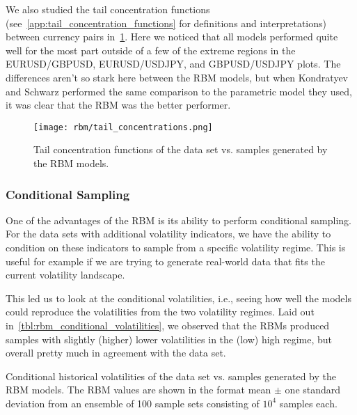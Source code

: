 We also studied the tail concentration functions (see~\cref{app:tail_concentration_functions} for definitions and interpretations) between currency pairs in~\cref{fig:rbm_tail_concentrations}.
Here we noticed that all models performed quite well for the most part outside of a few of the extreme regions in the EURUSD/GBPUSD, EURUSD/USDJPY, and GBPUSD/USDJPY plots.
The differences aren't so stark here between the RBM models, but when Kondratyev and Schwarz performed the same comparison to the parametric model they used, it was clear that the RBM was the better performer.
\begin{figure}[!htb]
    \begin{center}
        \texttt{[image: rbm/tail\_concentrations.png]}
    \end{center}
    \caption{Tail concentration functions of the data set vs. samples generated by the RBM models.}
    \label{fig:rbm_tail_concentrations}
\end{figure}

\subsubsection{Conditional Sampling}
One of the advantages of the RBM is its ability to perform conditional sampling.
For the data sets with additional volatility indicators, we have the ability to condition on these indicators to sample from a specific volatility regime.
This is useful for example if we are trying to generate real-world data that fits the current volatility landscape.

This led us to look at the conditional volatilities, i.e., seeing how well the models could reproduce the volatilities from the two volatility regimes.
Laid out in~\cref{tbl:rbm_conditional_volatilities}, we observed that the RBMs produced samples with slightly (higher) lower volatilities in the (low) high regime, but overall pretty much in agreement with the data set.
\begin{table}[!htb]
    \centering
    \begin{adjustbox}{max width=\textwidth}
        
    \end{adjustbox}
    \caption{Conditional historical volatilities of the data set vs. samples generated by the RBM models. The RBM values are shown in the format mean \(\pm\) one standard deviation from an ensemble of 100 sample sets consisting of \( 10^4 \) samples each.}
    \label{tbl:rbm_conditional_volatilities}
\end{table}

